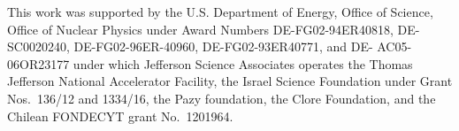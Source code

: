 \documentclass[review,number,sort&compress]{elsarticle}
\begin{document}
This work was supported by the U.S. Department of Energy, Office of Science, Office of Nuclear Physics under Award Numbers DE-FG02-94ER40818, DE-SC0020240, DE-FG02-96ER-40960, DE-FG02-93ER40771, and DE- AC05-06OR23177 under which Jefferson Science Associates operates the Thomas Jefferson National Accelerator Facility, the Israel Science Foundation under Grant Nos.\ 136/12 and 1334/16, the Pazy foundation, the Clore Foundation, and the Chilean FONDECYT grant No.\ 1201964.





 


%
%
\end{document}
